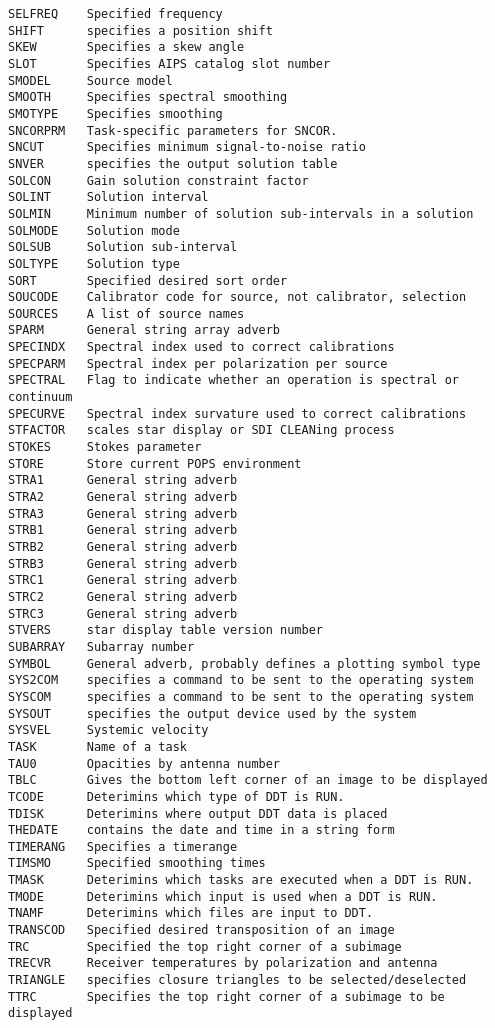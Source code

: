 \begin{verbatim}
SELFREQ    Specified frequency
SHIFT      specifies a position shift
SKEW       Specifies a skew angle
SLOT       Specifies AIPS catalog slot number
SMODEL     Source model
SMOOTH     Specifies spectral smoothing
SMOTYPE    Specifies smoothing
SNCORPRM   Task-specific parameters for SNCOR.
SNCUT      Specifies minimum signal-to-noise ratio
SNVER      specifies the output solution table
SOLCON     Gain solution constraint factor
SOLINT     Solution interval
SOLMIN     Minimum number of solution sub-intervals in a solution
SOLMODE    Solution mode
SOLSUB     Solution sub-interval
SOLTYPE    Solution type
SORT       Specified desired sort order
SOUCODE    Calibrator code for source, not calibrator, selection
SOURCES    A list of source names
SPARM      General string array adverb
SPECINDX   Spectral index used to correct calibrations
SPECPARM   Spectral index per polarization per source
SPECTRAL   Flag to indicate whether an operation is spectral or continuum
SPECURVE   Spectral index survature used to correct calibrations
STFACTOR   scales star display or SDI CLEANing process
STOKES     Stokes parameter
STORE      Store current POPS environment
STRA1      General string adverb
STRA2      General string adverb
STRA3      General string adverb
STRB1      General string adverb
STRB2      General string adverb
STRB3      General string adverb
STRC1      General string adverb
STRC2      General string adverb
STRC3      General string adverb
STVERS     star display table version number
SUBARRAY   Subarray number
SYMBOL     General adverb, probably defines a plotting symbol type
SYS2COM    specifies a command to be sent to the operating system
SYSCOM     specifies a command to be sent to the operating system
SYSOUT     specifies the output device used by the system
SYSVEL     Systemic velocity
TASK       Name of a task
TAU0       Opacities by antenna number
TBLC       Gives the bottom left corner of an image to be displayed
TCODE      Deterimins which type of DDT is RUN.
TDISK      Deterimins where output DDT data is placed
THEDATE    contains the date and time in a string form
TIMERANG   Specifies a timerange
TIMSMO     Specified smoothing times
TMASK      Deterimins which tasks are executed when a DDT is RUN.
TMODE      Deterimins which input is used when a DDT is RUN.
TNAMF      Deterimins which files are input to DDT.
TRANSCOD   Specified desired transposition of an image
TRC        Specified the top right corner of a subimage
TRECVR     Receiver temperatures by polarization and antenna
TRIANGLE   specifies closure triangles to be selected/deselected
TTRC       Specifies the top right corner of a subimage to be displayed

\end{verbatim}
